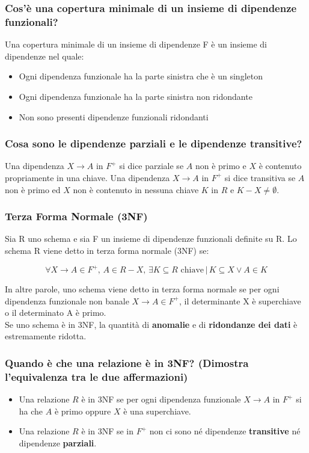\documentclass{article}
\begin{document}
\subsubsection{Cos'è una copertura minimale di un insieme di dipendenze funzionali?}
Una copertura minimale di un insieme di dipendenze F è un insieme di dipendenze nel quale:
\begin{itemize}
  \item Ogni dipendenza funzionale ha la parte sinistra che è un singleton
  \item Ogni dipendenza funzionale ha la parte sinistra non ridondante
  \item Non sono presenti dipendenze funzionali ridondanti
\end{itemize}



\subsubsection{Cosa sono le dipendenze parziali e le dipendenze transitive?}
Una dipendenza $X \rightarrow A$ in $F^+$ si dice parziale se $A$ non è primo e $X$ è contenuto propriamente in una chiave. Una dipendenza $X \rightarrow A$ in $F^+$ si dice transitiva se $A$ non è primo ed $X$ non è contenuto in nessuna chiave $K$ in $R$ e $K - X \neq \emptyset$.\\

\subsubsection{Terza Forma Normale (3NF)}
Sia R uno schema e sia F un insieme di dipendenze funzionali definite su R. Lo schema R viene detto in terza forma normale (3NF) se:

\[\forall X \rightarrow A \in F^+, \, A \in R - X, \, \exists K \subseteq R \text{ chiave} \,|\, K \subseteq X \vee A \in K\]

In altre parole, uno schema viene detto in terza forma normale se per ogni dipendenza funzionale non banale $X \rightarrow A \in F^+$, il determinante X è superchiave o il determinato A è primo.\\
Se uno schema è in 3NF, la quantità di \textbf{anomalie} e di \textbf{ridondanze dei dati} è estremamente ridotta.

\subsubsection{Quando è che una relazione è in 3NF? (Dimostra l'equivalenza tra le due affermazioni)}
\begin{itemize}
  \item Una relazione $R$ è in 3NF se per ogni dipendenza funzionale $X \rightarrow A$ in $F^+$ si ha che $A$ è primo oppure $X$ è una superchiave. \item Una relazione $R$ è in 3NF se in $F^+$ non ci sono né dipendenze \textbf{transitive} né dipendenze \textbf{parziali}.\\
\end{itemize}
\end{document}
